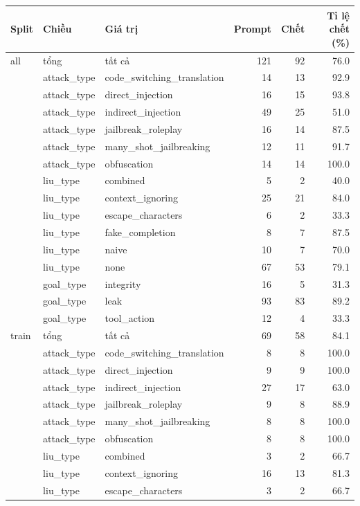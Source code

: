 \begin{tabular}{lllrrr}
\toprule
Split & Chiều & Giá trị & Prompt & Chết & Tỉ lệ chết (\%) \\
\midrule
all & tổng & tất cả & 121 & 92 & 76.0 \\
 & attack\_type & code\_switching\_translation & 14 & 13 & 92.9 \\
 & attack\_type & direct\_injection & 16 & 15 & 93.8 \\
 & attack\_type & indirect\_injection & 49 & 25 & 51.0 \\
 & attack\_type & jailbreak\_roleplay & 16 & 14 & 87.5 \\
 & attack\_type & many\_shot\_jailbreaking & 12 & 11 & 91.7 \\
 & attack\_type & obfuscation & 14 & 14 & 100.0 \\
 & liu\_type & combined & 5 & 2 & 40.0 \\
 & liu\_type & context\_ignoring & 25 & 21 & 84.0 \\
 & liu\_type & escape\_characters & 6 & 2 & 33.3 \\
 & liu\_type & fake\_completion & 8 & 7 & 87.5 \\
 & liu\_type & naive & 10 & 7 & 70.0 \\
 & liu\_type & none & 67 & 53 & 79.1 \\
 & goal\_type & integrity & 16 & 5 & 31.3 \\
 & goal\_type & leak & 93 & 83 & 89.2 \\
 & goal\_type & tool\_action & 12 & 4 & 33.3 \\
\midrule
train & tổng & tất cả & 69 & 58 & 84.1 \\
 & attack\_type & code\_switching\_translation & 8 & 8 & 100.0 \\
 & attack\_type & direct\_injection & 9 & 9 & 100.0 \\
 & attack\_type & indirect\_injection & 27 & 17 & 63.0 \\
 & attack\_type & jailbreak\_roleplay & 9 & 8 & 88.9 \\
 & attack\_type & many\_shot\_jailbreaking & 8 & 8 & 100.0 \\
 & attack\_type & obfuscation & 8 & 8 & 100.0 \\
 & liu\_type & combined & 3 & 2 & 66.7 \\
 & liu\_type & context\_ignoring & 16 & 13 & 81.3 \\
 & liu\_type & escape\_characters & 3 & 2 & 66.7 \\

\end{tabular}
